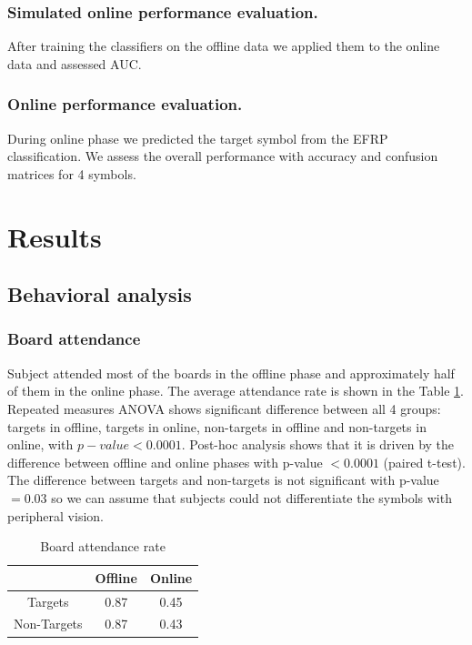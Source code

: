 \documentclass[12pt]{iopart}
\begin{document}
\subsubsection*{Simulated online performance evaluation.}
After training the classifiers on the offline data we applied them 
to the online data and assessed AUC.

\subsubsection*{Online performance evaluation.}
During online phase we predicted the target symbol from the EFRP classification.
We assess the overall performance with accuracy and confusion matrices
for 4 symbols.

\section{Results}
\label{sec:results}
\subsection{Behavioral analysis}

\subsubsection*{Board attendance}
Subject attended most of the boards in the offline phase and approximately
half of them in the online phase. The average attendance rate
is shown in the Table \ref{tab:boardAtt}. 
Repeated measures ANOVA shows significant difference between
all 4 groups: targets in offline, targets  in online,
non-targets in offline and non-targets in online, with $p-value < 0.0001$.
Post-hoc analysis shows that it is driven by the difference between
offline and online phases with p-value $< 0.0001$ (paired t-test).
The difference between targets and non-targets is not significant with p-value $= 0.03$
so we can assume that subjects could not differentiate the symbols
with peripheral vision.

\begin{table}
    \centering
    \caption{Board attendance rate}
    \begin{tabular}{c | c | c}
        \hline 
        & Offline & Online \\
        \hline 
        Targets & 0.87 & 0.45 \\
        Non-Targets & 0.87 & 0.43 \\
        \hline 
    \end{tabular}
    \label{tab:boardAtt}
\end{table}
\end{document}
